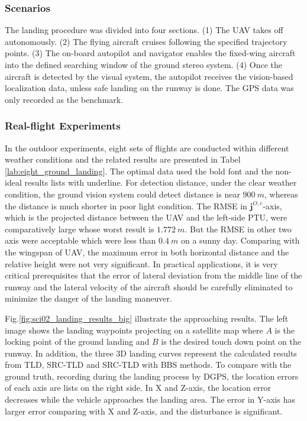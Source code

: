\subsubsection{Scenarios}

The landing procedure was divided into four sections. (1) The UAV takes off autonomously. (2) The flying aircraft cruises following the specified trajectory points. (3) The on-board autopilot and navigator enables the fixed-wing aircraft into the defined searching window of the ground stereo system. (4) Once the aircraft is detected by the visual system, the autopilot receives the vision-based localization data, unless safe landing on the runway is done. The GPS data was only recorded as the benchmark.






\subsubsection{Real-flight Experiments}
In the outdoor experiments, eight sets of flights are conducted within different weather conditions and the related results are presented in Tabel \ref{lab:eight_ground_landing}. The optimal data used the bold font and the non-ideal results lists with underline. For detection distance, under the clear weather condition, the ground vision system could detect distance is near $900\ m$, whereas the distance is much shorter in poor light condition. The RMSE in  $\mathbf{j}^{O,c}$-axis, which is the projected distance between the UAV and the left-side PTU, were comparatively large whose worst result is $1.772\ m$. But the RMSE in other two axis were acceptable which were less than $0.4\ m$ on a sunny day. Comparing with the wingspan of UAV, the maximum error in both horizontal distance and the relative height were not very significant. In practical applications, it is very critical prerequisites that the error of lateral deviation from the middle line of the runway and the lateral velocity of the aircraft should be carefully eliminated to minimize the danger of the landing maneuver. 

Fig.\ref{fig:sci02_landing_results_big} illustrate the approaching results. The left image shows the landing waypoints projecting on a satellite map where $A$ is the locking point of the ground landing and $B$ is the desired touch down point on the runway. In addition, the three 3D landing curves represent the calculated results from TLD, SRC-TLD and SRC-TLD with BBS methods. To compare with the ground truth, recording during the landing process by DGPS, the location errors of each axis are lists on the right side. In X and Z-axis, the location error decreases while the vehicle approaches the landing area. The error in Y-axis has larger error comparing with X and Z-axis, and the disturbance is significant.

